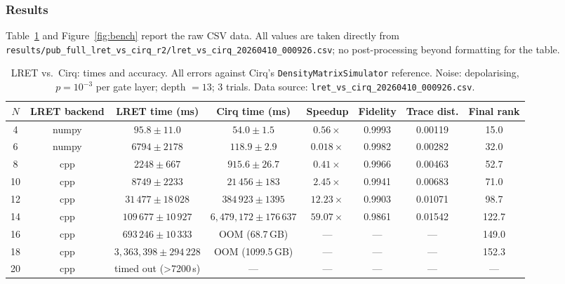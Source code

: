 \documentclass[11pt,a4paper]{article}
\begin{document}
\subsubsection*{Results}

Table~\ref{tab:bench} and Figure~\ref{fig:bench} report the raw CSV data. All values
are taken directly from
\texttt{results/pub\_full\_lret\_vs\_cirq\_r2/lret\_vs\_cirq\_20260410\_000926.csv};
no post-processing beyond formatting for the table.

\begin{table}[!h]
\centering
\renewcommand{\arraystretch}{1.2}
\caption{LRET vs.\ Cirq: times and accuracy. All errors against Cirq's
\texttt{DensityMatrixSimulator} reference. Noise: depolarising, $p=10^{-3}$ per gate
layer; depth $=13$; 3 trials.
Data source: \texttt{lret\_vs\_cirq\_20260410\_000926.csv}.}
\label{tab:bench}
\small
\begin{tabular}{@{}cccccccc@{}}
\toprule
$N$ & LRET backend & LRET time (ms) & Cirq time (ms) & Speedup & Fidelity & Trace dist. & Final rank \\
\midrule
4  & numpy & $95.8 \pm 11.0$             & $54.0 \pm 1.5$              & $0.56\times$   & 0.9993 & 0.00119 & 15.0 \\
6  & numpy & $6794 \pm 2178$             & $118.9 \pm 2.9$             & $0.018\times$  & 0.9982 & 0.00282 & 32.0 \\
8  & cpp   & $2248 \pm 667$              & $915.6 \pm 26.7$            & $0.41\times$   & 0.9966 & 0.00463 & 52.7 \\
10 & cpp   & $8749 \pm 2233$             & $21\,456 \pm 183$           & $2.45\times$   & 0.9941 & 0.00683 & 71.0 \\
12 & cpp   & $31\,477 \pm 18\,028$       & $384\,923 \pm 1395$         & $12.23\times$  & 0.9903 & 0.01071 & 98.7 \\
14 & cpp   & $109\,677 \pm 10\,927$      & $6{,}479{,}172 \pm 176\,637$ & $59.07\times$  & 0.9861 & 0.01542 & 122.7 \\
16 & cpp   & $693\,246 \pm 10\,333$      & OOM (68.7\,GB)              & ---            & ---    & ---     & 149.0 \\
18 & cpp   & $3{,}363{,}398 \pm 294\,228$ & OOM (1099.5\,GB)           & ---            & ---    & ---     & 152.3 \\
20 & cpp   & timed out (>7200\,s)        & ---                         & ---            & ---    & ---     & ---   \\
\bottomrule
\end{tabular}
\end{table}
\end{document}
